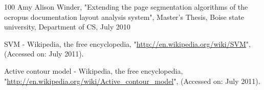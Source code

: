 \begin{thereferences}{100}
Amy Alison Winder, "Extending the page segmentation algorithms
of the ocropus documentation layout analysis system", Master's Thesis, Boise state university, Department of CS, July 2010

SVM - Wikipedia, the free encyclopedia, "\url{http://en.wikipedia.org/wiki/SVM}", (Accessed on: July
2011). 

Active contour model - Wikipedia, the free encyclopedia, "\url{http://en.wikipedia.org/wiki/Active_contour_model}", (Accessed on: July 2011). 





\end{thereferences}